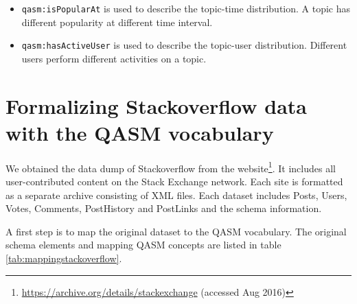 \begin{itemize}
\item \texttt{qasm:isPopularAt} is used to describe the topic-time distribution. A topic has different popularity at different time interval.

\item \texttt{qasm:hasActiveUser} is used to describe the topic-user distribution. Different users perform different activities on a topic.
\end{itemize}




\section{Formalizing Stackoverflow data with the QASM vocabulary}

We obtained the data dump of Stackoverflow from the website\footnote{\url{https://archive.org/details/stackexchange} (accessed Aug 2016)}. It includes all user-contributed content on the Stack Exchange network. Each site is formatted as a separate archive consisting of XML files. Each dataset includes Posts, Users, Votes, Comments, PostHistory and PostLinks and the schema information.

A first step is to map the original dataset to the QASM vocabulary. 
The original schema elements and mapping QASM concepts are listed in table \ref{tab:mappingstackoverflow}.

